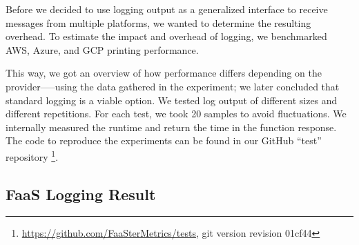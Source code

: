 \documentclass[../main.tex]{subfiles}
\begin{document}
Before we decided to use logging output as a generalized interface to receive messages from multiple platforms, 
we wanted to determine the resulting overhead.
To estimate the impact and overhead of logging, we benchmarked AWS, Azure, and GCP printing performance. 

This way, we got an overview of how performance differs depending on the provider—--using the data gathered 
in the experiment; we later concluded that standard logging is a viable option.
We tested log output of different sizes and different repetitions. 
For each test, we took 20 samples to avoid fluctuations.
We internally measured the runtime and return the time in the function response. 
The code to reproduce the experiments can be found in our GitHub ``test'' repository%
\footnote{\url{https://github.com/FaaSterMetrics/tests}, git version revision 01cf44}.

\subsection{FaaS Logging Result}%
\label{sub:designLoggingResult}
\end{document}
